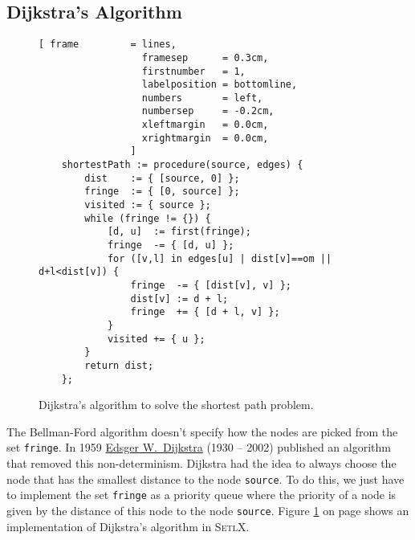 \subsection{Dijkstra's Algorithm}
\begin{figure}[!ht]
\centering
\begin{Verbatim}[ frame         = lines, 
                  framesep      = 0.3cm, 
                  firstnumber   = 1,
                  labelposition = bottomline,
                  numbers       = left,
                  numbersep     = -0.2cm,
                  xleftmargin   = 0.0cm,
                  xrightmargin  = 0.0cm,
                ]
    shortestPath := procedure(source, edges) {
        dist    := { [source, 0] };
        fringe  := { [0, source] };
        visited := { source };
        while (fringe != {}) {
            [d, u]  := first(fringe);
            fringe  -= { [d, u] };
            for ([v,l] in edges[u] | dist[v]==om || d+l<dist[v]) {
                fringe  -= { [dist[v], v] };
                dist[v] := d + l;
                fringe  += { [d + l, v] };
            }
            visited += { u };
        }
        return dist;
    };
\end{Verbatim}
\vspace*{-0.3cm}
\caption{Dijkstra's algorithm to solve the shortest path problem.}
\label{fig:dijkstra.stlx}
\end{figure}

\noindent
The Bellman-Ford algorithm doesn't specify how the nodes are picked from the set \texttt{fringe}.
In 1959 \href{https://en.wikipedia.org/wiki/Edsger_W._Dijkstra}{Edsger W.~Dijkstra} (1930 -- 2002) \cite{dijkstra:59}
published an algorithm that removed this non-determinism.  Dijkstra had the idea to always choose
the node that has the smallest distance to the node \texttt{source}.  To do this, we just have to
implement the set  \texttt{fringe} as a priority queue where the priority of a node is given by the
distance of this node to the node \texttt{source}.  Figure \ref{fig:dijkstra.stlx} on page
\pageref{fig:dijkstra.stlx} shows an implementation of Dijkstra's algorithm in \textsc{SetlX}.


